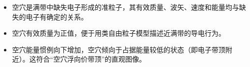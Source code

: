 \begin{insightbox}[物理图像]
\begin{itemize}
    \item 空穴是满带中缺失电子形成的准粒子，其有效质量、波矢、速度和能量均与缺失的电子有确定的关系。
    \item 空穴有效质量为正值，便于用类自由粒子模型描述近满带的导电行为。
    \item 空穴能量惯例向下增加，空穴倾向于占据能量较低的状态（即电子带顶附近）。这符合``空穴浮向价带顶''的直观图像。
\end{itemize}
\end{insightbox}
